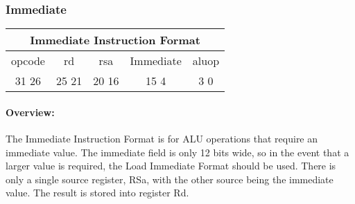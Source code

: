 \documentclass[letterpaper, 11pt]{article}
\begin{document}
\newpage
\subsubsection{Immediate}

\begin{center}
		\begin{tabular}{|c|c|c|c|c|}
			\multicolumn{5}{c}{Immediate Instruction Format}\\ \hline
				\hspace{2pt} opcode \hspace{2pt} & \hspace{5pt} rd \hspace{5pt} &  \hspace{4pt} rsa \hspace{4pt} & \hspace{10pt}Immediate  \hspace{10pt} & \hspace{3pt} aluop \hspace{3pt}   \\	\hline
			31 \hfill 26& 25 \hfill 21 &20 \hfill  16& 15  \hfill   4&3 \hfill   0\\ \hline
		
	\end{tabular}
\end{center}
\paragraph{Overview:}The Immediate Instruction Format is for ALU operations that require an immediate value. The immediate field
is only 12 bits wide, so in the event that a larger value is required, the Load Immediate Format should be used. There is only a single
source register, RSa, with the other source being the immediate value. The result is stored into register Rd.
\end{document}
